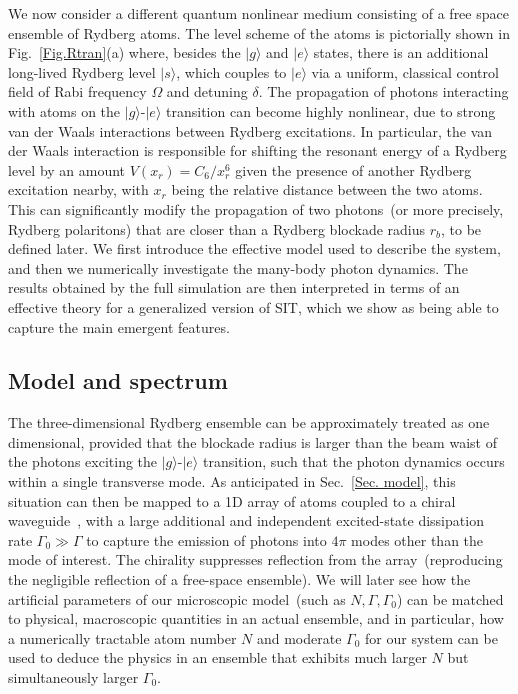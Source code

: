 \documentclass[pra,twocolumn,showpacs,preprintnumbers,amsmath,amssymb]{revtex4-1}
\begin{document}
We now consider a different quantum nonlinear medium consisting of a free space ensemble of Rydberg atoms. The level scheme of the atoms is pictorially shown in Fig.~\ref{Fig.Rtran}(a) where, besides the $|g\rangle$ and $|e\rangle$ states, there is an additional long-lived Rydberg level $|s\rangle$, which couples to $|e\rangle$ via a uniform, classical control field of Rabi frequency $\Omega$ and detuning $\delta$. The propagation of photons interacting with atoms on the $|g\rangle$-$|e\rangle$ transition can become highly nonlinear, due to strong van der Waals interactions between Rydberg excitations. In particular, the van der Waals interaction is responsible for shifting the resonant energy of a Rydberg level by an amount $V(x_r)=C_6/x_r^6$ given the presence of another Rydberg excitation nearby, with $x_r$ being the relative distance between the two atoms. This can significantly modify the propagation of two photons~(or more precisely, Rydberg polaritons) that are closer than a Rydberg blockade radius $r_b$, to be defined later. We first introduce the effective model used to describe the system, and then we numerically investigate the many-body photon dynamics. The results obtained by the full simulation are then interpreted in terms of an effective theory for a generalized version of SIT, which we show as being able to capture the main emergent features.


\subsection{Model and spectrum}\label{Sec.modelRyd}
The three-dimensional Rydberg ensemble can be approximately treated as one dimensional, provided that the blockade radius is larger than the beam waist of the photons exciting the $|g\rangle$-$|e\rangle$ transition, such that the photon dynamics occurs within a single transverse mode. As anticipated in Sec.~\ref{Sec. model}, this situation can then be mapped to a 1D array of atoms coupled to a chiral waveguide~\cite{bienas,MPSJames}, with a large additional and independent excited-state dissipation rate $\Gamma_0\gg \Gamma$ to capture the emission of photons into $4\pi$ modes other than the mode of interest. The chirality suppresses reflection from the array~(reproducing the negligible reflection of a free-space ensemble). We will later see how the artificial parameters of our microscopic model~(such as $N,\Gamma,\Gamma_0$) can be matched to physical, macroscopic quantities in an actual ensemble, and in particular, how a numerically tractable atom number $N$ and moderate $\Gamma_0$ for our system can be used to deduce the physics in an ensemble that exhibits much larger $N$ but simultaneously larger $\Gamma_0$.
\end{document}
